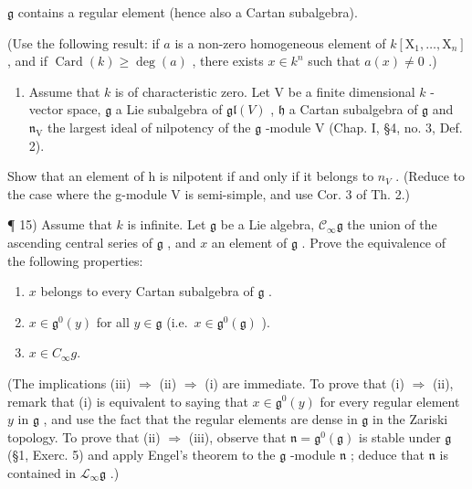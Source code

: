 \(\mathfrak{g}\) contains a regular element (hence also a Cartan subalgebra).

(Use the following result: if \(a\) is a non-zero homogeneous element of \(k[\mathrm{X}_1, \ldots, \mathrm{X}_n]\) , and if \(\operatorname{Card}(k) \geq \deg(a)\) , there exists \(x \in k^n\) such that \(a(x) \neq 0\) .)

\begin{enumerate}
\def\labelenumi{\arabic{enumi})}
\setcounter{enumi}{13}
\tightlist
\item
  Assume that \(k\) is of characteristic zero. Let V be a finite dimensional \(k\) -vector space, \(\mathfrak{g}\) a Lie subalgebra of \(\mathfrak{gl}(V)\) , \(\mathfrak{h}\) a Cartan subalgebra of \(\mathfrak{g}\) and \(\mathfrak{n}_{\mathrm{V}}\) the largest ideal of nilpotency of the \(\mathfrak{g}\) -module V (Chap. I, §4, no. 3, Def. 2).
\end{enumerate}

Show that an element of h is nilpotent if and only if it belongs to \(n_{V}\) . (Reduce to the case where the g-module V is semi-simple, and use Cor. 3 of Th. 2.)

¶ 15) Assume that \(k\) is infinite. Let \(\mathfrak{g}\) be a Lie algebra, \(\mathcal{C}_{\infty}\mathfrak{g}\) the union of the ascending central series of \(\mathfrak{g}\) , and \(x\) an element of \(\mathfrak{g}\) . Prove the equivalence of the following properties:

\begin{enumerate}
\def\labelenumi{(\roman{enumi})}
\item
  \(x\) belongs to every Cartan subalgebra of \(\mathfrak{g}\) .
\item
  \(x\in \mathfrak{g}^0 (y)\) for all \(y\in \mathfrak{g}\) (i.e.~\(x\in \mathfrak{g}^0 (\mathfrak{g})\) ).
\item
  \(x \in C_{\infty}g.\)
\end{enumerate}

(The implications (iii) \(\Longrightarrow\) (ii) \(\Longrightarrow\) (i) are immediate. To prove that (i) \(\Longrightarrow\) (ii), remark that (i) is equivalent to saying that \(x\in \mathfrak{g}^0 (y)\) for every regular element \(y\) in \(\mathfrak{g}\) , and use the fact that the regular elements are dense in \(\mathfrak{g}\) in the Zariski topology. To prove that (ii) \(\Longrightarrow\) (iii), observe that \(\mathfrak{n} = \mathfrak{g}^0 (\mathfrak{g})\) is stable under \(\mathfrak{g}\) (§1, Exerc. 5) and apply Engel's theorem to the \(\mathfrak{g}\) -module \(\mathfrak{n}\) ; deduce that \(\mathfrak{n}\) is contained in \(\mathcal{L}_{\infty}\mathfrak{g}\) .)


